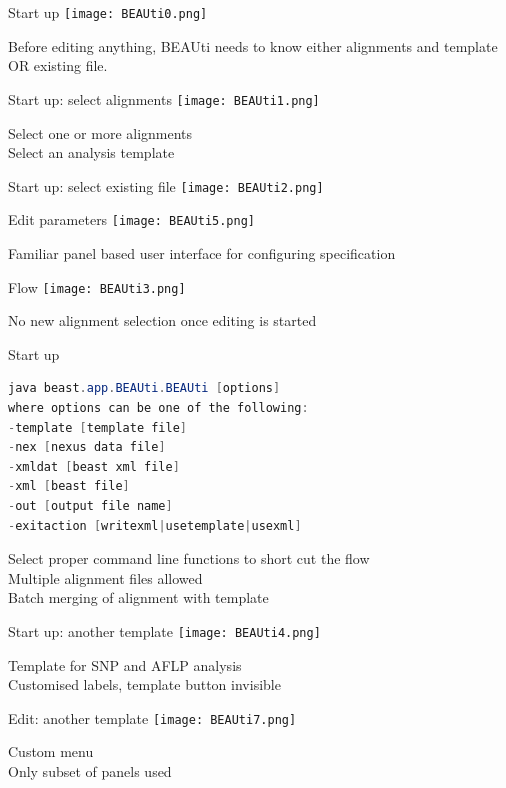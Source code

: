 \documentclass{beamer}
\theoremstyle{definition}
\begin{document}
\begin{frame}[containsverbatim]{Start up}
\texttt{[image: BEAUti0.png]}

Before editing anything, BEAUti needs to know either alignments and template OR existing file.
\end{frame}
\begin{frame}[containsverbatim]{Start up: select alignments}
\texttt{[image: BEAUti1.png]}

Select one or more alignments\\
Select an analysis template
\end{frame}
\begin{frame}[containsverbatim]{Start up: select existing file}
\texttt{[image: BEAUti2.png]}
\end{frame}
\begin{frame}[containsverbatim]{Edit parameters}
\texttt{[image: BEAUti5.png]}

Familiar panel based user interface for configuring specification
\end{frame}
\begin{frame}[containsverbatim]{Flow}
\texttt{[image: BEAUti3.png]}

No new alignment selection once editing is started
\end{frame}

\begin{frame}[containsverbatim]{Start up}
\begin{lstlisting}[language=java]
java beast.app.BEAUti.BEAUti [options]
where options can be one of the following:
-template [template file]
-nex [nexus data file]
-xmldat [beast xml file]
-xml [beast file]
-out [output file name]
-exitaction [writexml|usetemplate|usexml]
\end{lstlisting}

Select proper command line functions to short cut the flow\\
Multiple alignment files allowed\\
Batch merging of alignment with template

\end{frame}

\begin{frame}[containsverbatim]{Start up: another template}
\texttt{[image: BEAUti4.png]}

Template for SNP and AFLP analysis\\
Customised labels, template button invisible
\end{frame}
\begin{frame}[containsverbatim]{Edit: another template}
\texttt{[image: BEAUti7.png]}

Custom menu\\
Only subset of panels used
\end{frame}
\end{document}
